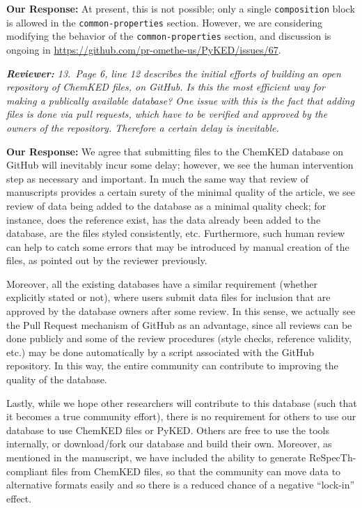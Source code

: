 \documentclass[a4paper,10pt]{elsarticle}
\newenvironment{reviewer}{\vspace{0.5\baselineskip}\begingroup\itshape\textbf{Reviewer:}}{\endgroup}
\newenvironment{response}{\textbf{Our Response:}}{\vspace{0.5\baselineskip}}
\begin{document}
\begin{response}
    At present, this is not possible; only a single \verb|composition| block is allowed in the
    \verb|common-properties| section. However, we are considering modifying the behavior of the
    \verb|common-properties| section, and discussion is ongoing in
    \url{https://github.com/pr-omethe-us/PyKED/issues/67}.
\end{response}

\begin{reviewer}
    13.~Page 6, line 12 describes the initial efforts of building an open repository of ChemKED
    files, on GitHub. Is this the most efficient way for making a publically available database? One
    issue with this is the fact that adding files is done via pull requests, which have to be
    verified and approved by the owners of the repository. Therefore a certain delay is inevitable.
\end{reviewer}

\begin{response}
    We agree that submitting files to the ChemKED database on GitHub will inevitably incur some
    delay; however, we see the human intervention step as necessary and important. In much the same
    way that review of manuscripts provides a certain surety of the minimal quality of the article,
    we see review of data being added to the database as a minimal quality check; for instance, does
    the reference exist, has the data already been added to the database, are the files styled
    consistently, etc. Furthermore, such human review can help to catch some errors that may be
    introduced by manual creation of the files, as pointed out by the reviewer previously.

    Moreover, all the existing databases have a similar requirement (whether explicitly stated or
    not), where users submit data files for inclusion that are approved by the database owners after
    some review. In this sense, we actually see the Pull Request mechanism of GitHub as an
    advantage, since all reviews can be done publicly and some of the review procedures (style
    checks, reference validity, etc.) may be done automatically by a script associated with the
    GitHub repository. In this way, the entire community can contribute to improving the quality of
    the database.

    Lastly, while we hope other researchers will contribute to this database (such that it becomes a
    true community effort), there is no requirement for others to use our database to use ChemKED
    files or PyKED. Others are free to use the tools internally, or download\slash fork our database
    and build their own. Moreover, as mentioned in the manuscript, we have included the ability to
    generate ReSpecTh-compliant files from ChemKED files, so that the community can move data to
    alternative formats easily and so there is a reduced chance of a negative ``lock-in'' effect.
\end{response}
\end{document}
